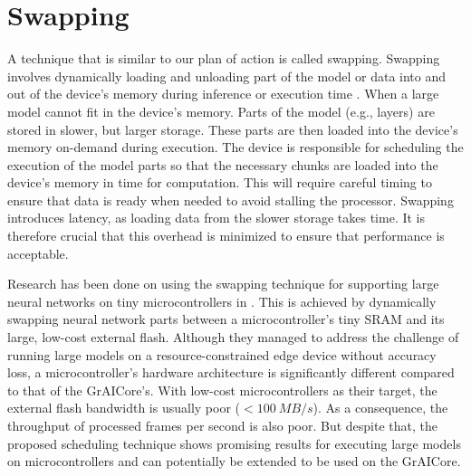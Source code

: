\section{Swapping}

A technique that is similar to our plan of action is called swapping.
Swapping involves dynamically loading and unloading part of the model or data into and out of the device’s memory during inference or execution time \cite{wangSwapNetEfficientSwapping2024, huangSwapAdvisorPushingDeep2020}.
\cite{wang_swapnet_2024, huang_swapadvisor_2020}
When a large model cannot fit in the device’s memory. Parts of the model (e.g., layers) are stored in slower, but larger storage.
These parts are then loaded into the device’s memory on-demand during execution.
The device is responsible for scheduling the execution of the model parts so that the necessary chunks are loaded into the device’s memory in time for computation.
This will require careful timing to ensure that data is ready when needed to avoid stalling the processor.
Swapping introduces latency, as loading data from the slower storage takes time.
It is therefore crucial that this overhead is minimized to ensure that performance is acceptable.

Research has been done on using the swapping technique for supporting large neural networks on tiny microcontrollers in \cite{miaoEnablingLargeNeural2021}.
This is achieved by dynamically swapping neural network parts between a microcontroller's tiny SRAM and its large, low-cost external flash.
Although they managed to address the challenge of running large models on a resource-constrained edge device without accuracy loss, a microcontroller's hardware architecture is significantly different compared to that of the GrAICore's.
With low-cost microcontrollers as their target, the external flash bandwidth is usually poor ($<\SI{100}{MB/s}$).
As a consequence, the throughput of processed frames per second is also poor.
But despite that, the proposed scheduling technique shows promising results for executing large models on microcontrollers and can potentially be extended to be used on the GrAICore.